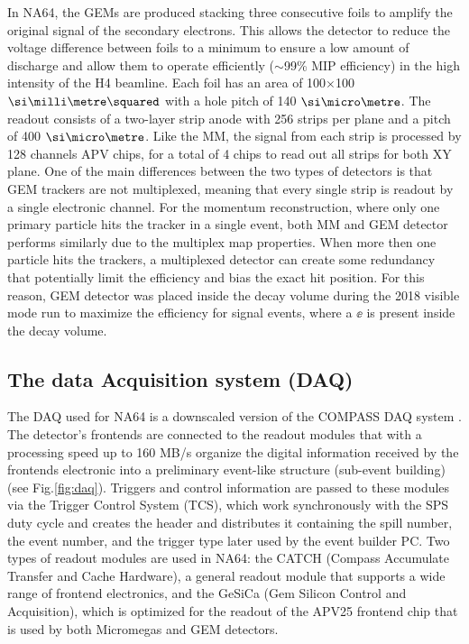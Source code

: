 In NA64, the GEMs are produced stacking three consecutive foils to amplify the original signal of the secondary electrons. This allows the detector to reduce the voltage difference between foils to a minimum to ensure a low amount of discharge and allow them to operate efficiently ($\sim$99\% MIP efficiency) in the high intensity of the H4 beamline. Each foil has an area of 100$\times$100 $\mms$ with a hole pitch of 140 $\mum$. The readout consists of a two-layer strip anode with 256 strips per plane and a pitch of 400 $\mum$. Like the MM, the signal from each strip is processed by 128 channels APV chips, for a total of 4 chips to read out all strips for both XY plane.
One of the main differences between the two types of detectors is that GEM trackers are not multiplexed, meaning that every single strip is readout by a single electronic channel. For the momentum reconstruction, where only one primary particle hits the tracker in a single event, both MM and GEM detector performs similarly due to the multiplex map properties. When more then one particle hits the trackers, a multiplexed detector can create some redundancy that potentially limit the efficiency and bias the exact hit position. For this reason, GEM detector was placed inside the decay volume during the 2018 visible mode run to maximize the efficiency for signal events, where a $\ee$ is present inside the decay volume.

\subsection{The data Acquisition system (DAQ)}
\label{ch2:sec:daq}

The DAQ used for NA64 is a downscaled version of the COMPASS DAQ system \cite{Bodlak_2013,COMPASS-daq}. The detector's frontends are connected to the readout modules that with a processing speed up to 160 MB/s organize the digital information received by the frontends electronic into a preliminary event-like structure (sub-event building) (see Fig.\ref{fig:daq}). Triggers and control information are passed to these modules via the Trigger Control System (TCS), which work synchronously with the SPS duty cycle and creates the header and distributes it containing the spill number, the event number, and the trigger type later used by the event builder PC. Two types of readout modules are used in NA64: the CATCH (Compass Accumulate Transfer and Cache Hardware), a general readout module that supports a wide range of frontend electronics, and the GeSiCa (Gem Silicon Control and Acquisition), which is optimized for the readout of the APV25 frontend chip that is used by both Micromegas and GEM detectors.

